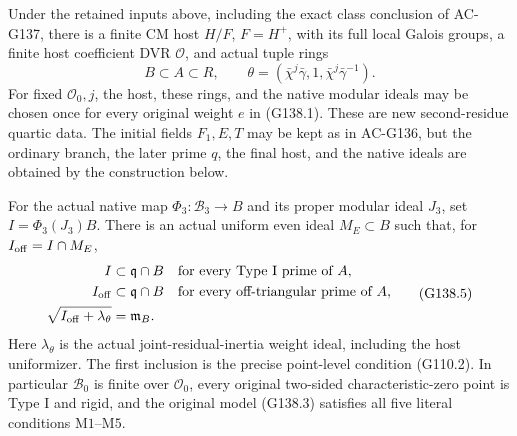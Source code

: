 \begin{theorem}
\label{AC-G138-quartic-model}
Under the retained inputs above, including the exact class
conclusion of AC-G137, there is a finite CM host \(H/F\),
\(F=H^+\), with its full local Galois groups, a finite host
coefficient DVR \(\mathcal O\), and actual tuple rings
\[
 B\subset A\subset R,\qquad
 \theta=(\bar\chi^j\bar\gamma,1,
                         \bar\chi^j\bar\gamma^{-1}).
 \tag{G138.4}
\]
For fixed \(\mathcal O_0,j\), the host, these rings, and the
native modular ideals may be chosen once for every original
weight \(e\) in (G138.1).  These are new second-residue quartic
data.  The initial fields \(F_1,E,T\) may be kept as in AC-G136,
but the ordinary branch, the later prime \(q\), the final host,
and the native ideals are obtained by the construction below.

For the actual native map \(\Phi_3:\mathcal B_3\to B\) and
its proper modular ideal \(J_3\), set
\(I=\Phi_3(J_3)B\).  There is an actual uniform even ideal
\(M_E\subset B\) such that, for \(I_{\rm off}=I\cap M_E\),
\[
 \begin{aligned}
 I&\subset\mathfrak q\cap B
       &&\text{for every Type I prime of }A,\\
 I_{\rm off}&\subset\mathfrak q\cap B
       &&\text{for every off-triangular prime of }A,\\
 \sqrt{I_{\rm off}+\lambda_\theta}&=\mathfrak m_B.
 \end{aligned}
 \tag{G138.5}
\]
Here \(\lambda_\theta\) is the actual joint-residual-inertia
weight ideal, including the host uniformizer.
The first inclusion is the precise point-level condition
(G110.2).  In particular
\(\mathscr B_0\) is finite over \(\mathcal O_0\), every original
two-sided characteristic-zero point is Type I and rigid, and
the original model (G138.3) satisfies all five literal
conditions \(\mathrm{M1}\)--\(\mathrm{M5}\).


\end{theorem}
